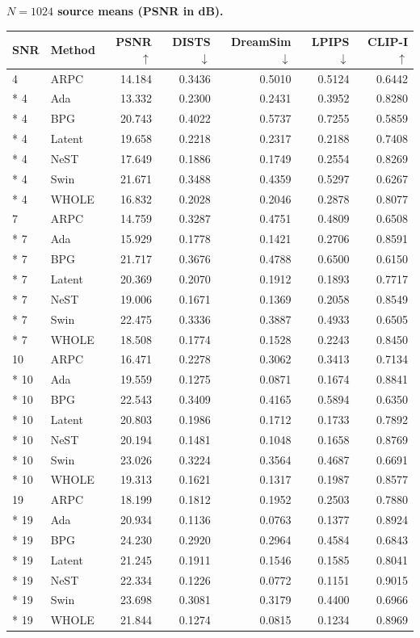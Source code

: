 \documentclass[10pt,letterpaper]{article}
\begin{document}
\textbf{$N=1024$ source means (PSNR in dB).}\par
{\small\setlength{\tabcolsep}{3pt}\renewcommand{\arraystretch}{1.08}
\begin{longtable}{@{}llrrrrr@{}}\toprule
SNR & Method & PSNR $\uparrow$ & DISTS $\downarrow$ & DreamSim $\downarrow$ & LPIPS $\downarrow$ & CLIP-I $\uparrow$\\\midrule\endhead
4 & ARPC & 14.184 & 0.3436 & 0.5010 & 0.5124 & 0.6442\\*
4 & Ada & 13.332 & 0.2300 & 0.2431 & 0.3952 & 0.8280\\*
4 & BPG & 20.743 & 0.4022 & 0.5737 & 0.7255 & 0.5859\\*
4 & Latent & 19.658 & 0.2218 & 0.2317 & 0.2188 & 0.7408\\*
4 & NeST & 17.649 & 0.1886 & 0.1749 & 0.2554 & 0.8269\\*
4 & Swin & 21.671 & 0.3488 & 0.4359 & 0.5297 & 0.6267\\*
4 & WHOLE & 16.832 & 0.2028 & 0.2046 & 0.2878 & 0.8077\\
7 & ARPC & 14.759 & 0.3287 & 0.4751 & 0.4809 & 0.6508\\*
7 & Ada & 15.929 & 0.1778 & 0.1421 & 0.2706 & 0.8591\\*
7 & BPG & 21.717 & 0.3676 & 0.4788 & 0.6500 & 0.6150\\*
7 & Latent & 20.369 & 0.2070 & 0.1912 & 0.1893 & 0.7717\\*
7 & NeST & 19.006 & 0.1671 & 0.1369 & 0.2058 & 0.8549\\*
7 & Swin & 22.475 & 0.3336 & 0.3887 & 0.4933 & 0.6505\\*
7 & WHOLE & 18.508 & 0.1774 & 0.1528 & 0.2243 & 0.8450\\
10 & ARPC & 16.471 & 0.2278 & 0.3062 & 0.3413 & 0.7134\\*
10 & Ada & 19.559 & 0.1275 & 0.0871 & 0.1674 & 0.8841\\*
10 & BPG & 22.543 & 0.3409 & 0.4165 & 0.5894 & 0.6350\\*
10 & Latent & 20.803 & 0.1986 & 0.1712 & 0.1733 & 0.7892\\*
10 & NeST & 20.194 & 0.1481 & 0.1048 & 0.1658 & 0.8769\\*
10 & Swin & 23.026 & 0.3224 & 0.3564 & 0.4687 & 0.6691\\*
10 & WHOLE & 19.313 & 0.1621 & 0.1317 & 0.1987 & 0.8577\\
19 & ARPC & 18.199 & 0.1812 & 0.1952 & 0.2503 & 0.7880\\*
19 & Ada & 20.934 & 0.1136 & 0.0763 & 0.1377 & 0.8924\\*
19 & BPG & 24.230 & 0.2920 & 0.2964 & 0.4584 & 0.6843\\*
19 & Latent & 21.245 & 0.1911 & 0.1546 & 0.1585 & 0.8041\\*
19 & NeST & 22.334 & 0.1226 & 0.0772 & 0.1151 & 0.9015\\*
19 & Swin & 23.698 & 0.3081 & 0.3179 & 0.4400 & 0.6966\\*
19 & WHOLE & 21.844 & 0.1274 & 0.0815 & 0.1234 & 0.8969\\
\bottomrule\end{longtable}}
\end{document}
